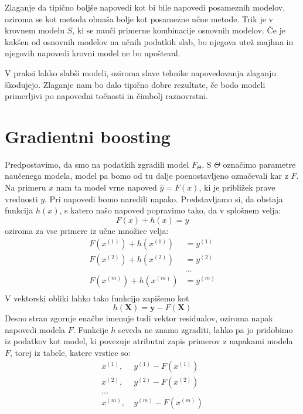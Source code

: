 Zlaganje da tipično boljše napovedi kot bi bile napovedi posameznih modelov, oziroma se kot metoda obnaša bolje kot posamezne učne metode. Trik je v krovnem modelu $S$, ki se nauči primerne kombinacije osnovnih modelov. Če je kakšen od osnovnih modelov na učnih podatkih slab, bo njegova utež majhna in njegovih napovedi krovni model ne bo upošteval.

V praksi lahko slabši modeli, oziroma slave tehnike napovedovanja zlaganju škodujejo. Zlaganje nam bo dalo tipično dobre rezultate, če bodo modeli primerljivi po napovedni točnosti in čimbolj raznovrstni.

\section{Gradientni boosting}

Predpostavimo, da smo na podatkih zgradili model $F_\Theta$. S $\Theta$ označimo parametre naučenega modela, model pa bomo od tu dalje poenostavljeno označevali kar z $F$. Na primeru $x$ nam ta model vrne napoved $\hat{y}=F(x)$, ki je približek prave vrednosti $y$. Pri napovedi bomo naredili napako. Predstavljamo si, da obstaja funkcija $h(x)$, s katero našo napoved popravimo tako, da v splošnem velja:
\begin{equation}
  F(x)+h(x)=y \nonumber
\end{equation}
oziroma za vse primere iz učne množice velja:
\begin{equation}
  \begin{split}
    F(x^{(1)})+h(x^{(1)})& = y^{(1)} \\
    F(x^{(2)})+h(x^{(2)})& = y^{(2)} \\
    & \ldots \\
    F(x^{(m)})+h(x^{(m)})& = y^{(m)} \\
  \end{split}
  \label{eq:gb-residual}
\end{equation}
%
V vektorski obliki lahko tako funkcijo zapišemo kot
\begin{equation}
  h({\bm X})={\bm y}-F({\bm X}) \nonumber
\end{equation}
%
Desno stran zgornje enačbe imenuje tudi vektor residualov, oziroma napak napovedi modela $F$. Funkcije $h$ seveda ne znamo zgraditi, lahko pa jo pridobimo iz podatkov kot model, ki povezuje atributni zapis primerov z napakami modela $F$, torej iz tabele, katere vrstice so:
\begin{equation}
  \nonumber
  \begin{split}
  x^{(1)}, &\ y^{(1)}-F(x^{(1)}) \\
  x^{(2)}, &\ y^{(2)}-F(x^{(2)}) \\
  \ldots \\
  x^{(m)}, &\ y^{(m)}-F(x^{(m)})
  \end{split}
\end{equation}

